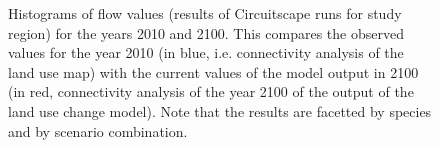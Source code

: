 \begin{figure}[h!]
 \caption[Histograms of flow values for all species and scenarios, comparing timesteps 2010 (observed) with 2100 (predicted)]{Histograms of flow values (results of Circuitscape runs for study region) for the years 2010 and 2100. This compares the observed values for the year 2010 (in blue, i.e. connectivity analysis of the land use map) with the current values of the model output in 2100 (in red, connectivity analysis of the year 2100 of the output of the land use change model). Note that the results are facetted by species and by scenario combination.}
 \label{fig:hist_1}
\end{figure}



